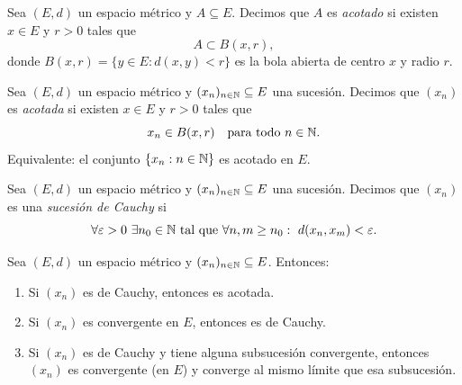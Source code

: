 \begin{defi}
Sea $(E,d)$ un espacio métrico y $A \subseteq E$.
Decimos que $A$ es \emph{acotado} si existen $x \in E$ y $r>0$ tales que
\[
A \subset B(x,r),
\]
donde $B(x,r) = \{y \in E : d(x,y) < r\}$ es la bola abierta de centro $x$
y radio $r$.
\end{defi}

\begin{defi}
Sea $(E,d)$ un espacio métrico y $(x_n)_{n\in\mathbb{N}} \subseteq E$ una sucesión.
Decimos que $(x_n)$ es \emph{acotada} si existen $x \in E$ y $r>0$ tales que
\[
x_n \in B(x,r) \quad \text{para todo } n \in \mathbb{N}.
\]
Equivalente: el conjunto $\{x_n : n \in \mathbb{N}\}$ es acotado en $E$.
\end{defi}

\begin{defi}
Sea $(E,d)$ un espacio métrico y $(x_n)_{n\in\mathbb{N}} \subseteq E$ una sucesión.
Decimos que $(x_n)$ es una \emph{sucesión de Cauchy} si
\[
\forall \varepsilon>0\ \exists n_0 \in \N\ \text{tal que}\ \forall n,m \ge n_0:
\ d(x_n,x_m) < \varepsilon.
\]
\end{defi}

\begin{teo}
Sea $(E,d)$ un espacio métrico y $(x_n)_{n\in\mathbb{N}} \subseteq E$. Entonces:
\begin{enumerate}[label=(\arabic*)]
    \item Si $(x_n)$ es de Cauchy, entonces es acotada.
    \item Si $(x_n)$ es convergente en $E$, entonces es de Cauchy.
    \item Si $(x_n)$ es de Cauchy y tiene alguna subsucesión convergente,
    entonces $(x_n)$ es convergente (en $E$) y converge al mismo límite
    que esa subsucesión.
\end{enumerate}
\end{teo}

